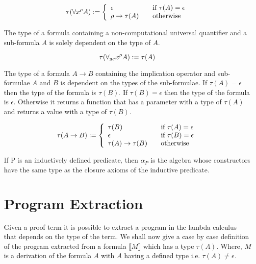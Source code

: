 \[
\tau(\forall x^{\rho} A) := \left\{ 
\begin{array}{l l}
  \epsilon & \quad \text{if $\tau(A) = \epsilon$}\\
 \rho \to \tau (A) & \quad \text{otherwise}\\
\end{array} \right.
\]


The type of a formula containing a non-computational universal quantifier and a sub-formula $A$
is solely dependent on the type of $A$.

\[
\tau(\forall_{\mathrm{nc}} x^{\rho} A) := \tau(A)
\]



The type of a formula $A \to B$ containing the implication operator and
sub-formulae $A$ and $B$ is dependent on the types of the sub-formulae.
If $\tau (A) = \epsilon$ then the type of the formula is $ \tau (B)$. If $\tau
(B) = \epsilon$ then the type of the formula is $\epsilon$. Otherwise it
returns a function that has a parameter with a type of $\tau (A)$ and returns a value with
a type of $\tau (B)$.

\[
\tau(A \to B) := \left\{ 
\begin{array}{l l}
  \tau (B) & \quad \text{if $\tau (A) = \epsilon$}\\
  \epsilon & \quad \text{if $\tau (B) = \epsilon$}\\
  \tau (A) \to \tau (B) & \quad \text{otherwise}\\
\end{array} \right.
\]

If P  is an inductively defined predicate, then $\alpha_P$ is the algebra whose constructors have the same type as the closure axioms of the inductive predicate.

\section{Program Extraction}
Given a proof term it is possible to extract a program in the lambda calculus  that depends on the type of the term. We shall now give a case by case definition of the program extracted from a formula $\llbracket M \rrbracket$ which has a type $\tau (A)$. Where, $M$ is a derivation of the formula $A$ with $A$ having a defined type i.e. $ \tau (A) \neq \epsilon $.


